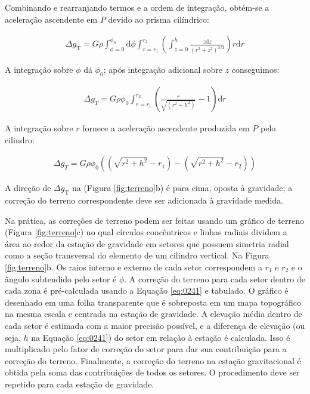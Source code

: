 \documentclass[]{book}
\theoremstyle{definition}
\theoremstyle{definition}
\theoremstyle{definition}
\theoremstyle{remark}
\begin{document}
Combinando e rearranjando termos e a ordem de integração, obtém-se a aceleração ascendente em \(P\) devido ao prisma cilíndrico:

\begin{align}
\Delta g_{\mathrm{T}}=G \rho \int_{\phi=0}^{\phi_{0}} \mathrm{d} \phi \int_{r=r_{1}}^{r_{2}}\left(\int_{z=0}^{h} \frac{z \mathrm{d} z}{\left(r^{2}+z^{2}\right)^{3 / 2}}\right) r \mathrm{d} r \label{eq:0239}
\end{align}

A integração sobre \(\phi\) dá \(\phi_0\); após integração adicional sobre \(z\) conseguimos:

\begin{align}
\Delta g_{T}=G \rho \phi_{0} \int_{r=r_{1}}^{r_{2}}\left(\frac{r}{\sqrt{\left(r^{2}+h^{2}\right)}}-1\right) \mathrm{d} r \label{eq:0240}
\end{align}

A integração sobre \(r\) fornece a aceleração ascendente produzida em \(P\) pelo cilindro:

\begin{align}
\Delta g_{T}=G \rho \phi_{0}\left(\left(\sqrt{r^{2}+h^{2}}-r_{1}\right)-\left(\sqrt{r^{2}+h^{2}}-r_{2}\right)\right) \label{eq:0241}
\end{align}

A direção de \(\Delta g_{\mathrm{T}}\) na (Figura \ref{fig:terreno}b) é para cima, oposta à gravidade; a correção do terreno correspondente deve ser adicionada à gravidade medida.

Na prática, as correções de terreno podem ser feitas usando um gráfico de terreno (Figura \ref{fig:terreno}c) no qual círculos concêntricos e linhas radiais dividem a área ao redor da estação de gravidade em setores que possuem simetria radial como a seção transversal do elemento de um cilindro vertical. Na Figura \ref{fig:terreno}b. Os raios interno e externo de cada setor correspondem a \(r_1\) e \(r_2\) e o ângulo subtendido pelo setor é \(\phi\). A correção do terreno para cada setor dentro de cada zona é pré-calculada usando a Equação \eqref{eq:0241} e tabulado. O gráfico é desenhado em uma folha transparente que é sobreposta em um mapa topográfico na mesma escala e centrada na estação de gravidade. A elevação média dentro de cada setor é estimada com a maior precisão possível, e a diferença de elevação (ou seja, \(h\) na Equação \eqref{eq:0241}) do setor em relação à estação é calculada. Isso é multiplicado pelo fator de correção do setor para dar sua contribuição para a correção do terreno. Finalmente, a correção do terreno na estação gravitacional é obtida pela soma das contribuições de todos os setores. O procedimento deve ser repetido para cada estação de gravidade.
\end{document}

